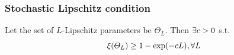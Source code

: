 \begin{frame}
  \frametitle{Stochastic Lipschitz condition}
  \begin{assumption}
    Let the set of $L$-Lipschitz parameters be $\Theta_L$.
    Then $\exists c  > 0$ s.t. 
    \begin{equation}
      \xi(\Theta_L) \geq 1 -  \exp(-cL), \forall L
    \end{equation}
    \label{ass:hoelder-measure-observations}
  \end{assumption}
\end{frame}


